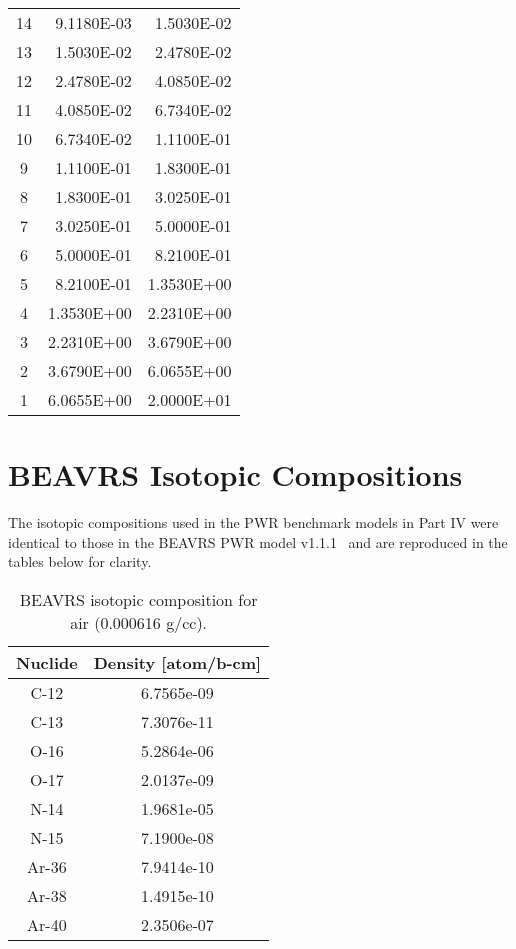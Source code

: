\begin{appendices}
{\begin{longtable}[h!]{c r r}
14 & 9.1180E-03 & 1.5030E-02 \\
13 & 1.5030E-02 & 2.4780E-02 \\
12 & 2.4780E-02 & 4.0850E-02 \\
11 & 4.0850E-02 & 6.7340E-02 \\
10 & 6.7340E-02 & 1.1100E-01 \\
9 & 1.1100E-01 & 1.8300E-01 \\
8 & 1.8300E-01 & 3.0250E-01 \\
7 & 3.0250E-01 & 5.0000E-01 \\
6 & 5.0000E-01 & 8.2100E-01 \\
5 & 8.2100E-01 & 1.3530E+00 \\
4 & 1.3530E+00 & 2.2310E+00 \\
3 & 2.2310E+00 & 3.6790E+00 \\
2 & 3.6790E+00 & 6.0655E+00 \\
1 & 6.0655E+00 & 2.0000E+01 \\
  \bottomrule
\end{longtable}}


\chapter{BEAVRS Isotopic Compositions}
\label{app:beavrs-isotopes}

The isotopic compositions used in the \ac{PWR} benchmark models in Part IV were identical to those in the \ac{BEAVRS} \ac{PWR} model v1.1.1~\cite{horelik2013beavrs} and are reproduced in the tables below for clarity.

\begin{table}[h!]
  \centering
  \caption[BEAVRS isotopic composition for air]{BEAVRS isotopic composition for air (0.000616 g/cc).}
  \footnotesize
  \label{table:chap7-beavrs-isotopes-air}
  \vspace{6pt}
  \begin{tabular}{c c}
  \toprule
  \rowcolor{lightgray}
  {\bf Nuclide} &
  {\bf Density [atom/b-cm]} \\
  \midrule
  C-12 & 6.7565e-09 \\
  C-13 & 7.3076e-11 \\
  O-16 & 5.2864e-06 \\
  O-17 & 2.0137e-09 \\
  N-14 & 1.9681e-05 \\
  N-15 & 7.1900e-08 \\
  Ar-36 & 7.9414e-10 \\
  Ar-38 & 1.4915e-10 \\
  Ar-40 & 2.3506e-07 \\
  \bottomrule
\end{tabular}
\end{table}


\end{appendices}
